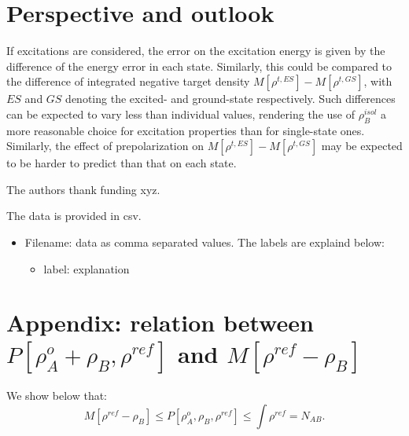 \documentclass[journal=jctcce,manuscript=article, layout=twocolumn]{achemso}
\begin{document}
\section{Perspective and outlook}
If excitations are considered, the error on the excitation energy is given by the difference of the energy error in each state. 
Similarly, this could be compared to the difference of integrated negative target density $M[\rho^{t, ES}] - M[\rho^{t, GS}]$, with $ES$ and $GS$ denoting the excited- and ground-state respectively.
Such differences can be expected to vary less than individual values, rendering the use of $\rho_B^{isol}$ a more reasonable choice for excitation properties than for single-state ones.
Similarly, the effect of prepolarization on $M[\rho^{t, ES}] - M[\rho^{t, GS}]$ may be expected to be harder to predict than that on each state. 

\begin{acknowledgement}
The authors thank funding xyz.
\end{acknowledgement}

\begin{suppinfo}
The data is provided in csv.
\begin{itemize}
  \item Filename: data as comma separated values. The labels are explaind below:
  \begin{itemize}
   \item label: explanation
  \end{itemize}
\end{itemize}
\end{suppinfo}

\section{Appendix: relation between $P[\rho^{o}_A + \rho_B, \rho^{ref}]$ and $M[\rho^{ref} - \rho_B]$}
We show below that:
\begin{equation} \label{eq:P_bound_2}
 M[\rho^{ref} - \rho_B] \leq P[\rho^{o}_A, \rho_B, \rho^{ref}] \leq \int \rho^{ref} = N_{AB}.
\end{equation}
\end{document}
